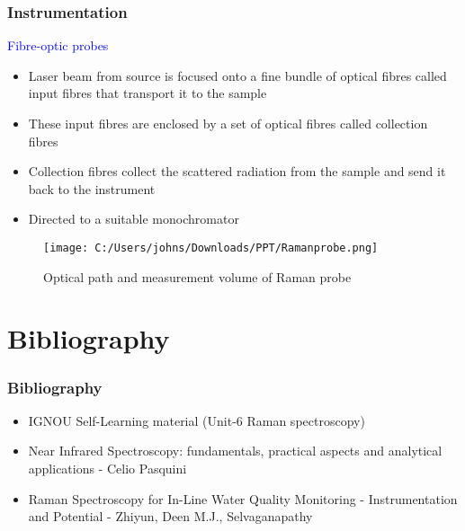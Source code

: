 \documentclass{beamer}
\begin{document}
\begin{frame}
\frametitle{Instrumentation}
\large{\textcolor{blue}{Fibre-optic probes}}
\\
\begin{itemize}[\textbullet]
\item Laser beam from source is focused onto a fine bundle 
of optical fibres called input fibres that transport it to the sample
\item These input fibres are enclosed by a set of optical fibres called collection fibres
\item Collection fibres collect the scattered radiation from the sample and send it back to the instrument
\item Directed to a suitable monochromator
\end{itemize}
\begin{figure}[ht]
  \centering
  \texttt{[image: C:/Users/johns/Downloads/PPT/Ramanprobe.png]}
    \caption{Optical path and measurement volume of Raman probe}
    \label{fig:1}
\end{figure}
\end{frame}



\section{Bibliography}
\begin{frame}
\frametitle{Bibliography}
\begin{itemize}[\textbullet]
\item IGNOU Self-Learning material (Unit-6 Raman spectroscopy)
\item Near Infrared Spectroscopy: fundamentals, practical aspects and analytical applications - Celio Pasquini
\item Raman Spectroscopy for In-Line Water Quality Monitoring - Instrumentation and Potential - Zhiyun, Deen M.J., Selvaganapathy
\end{itemize}
\end{frame}
\end{document}
